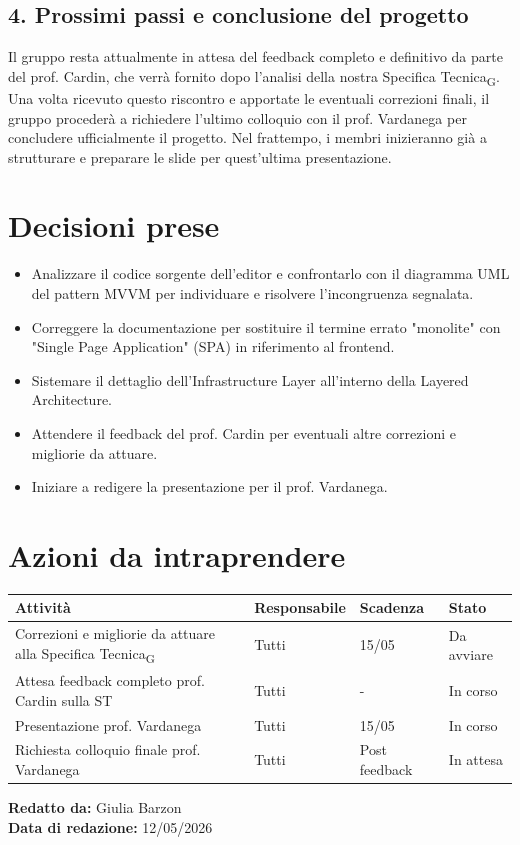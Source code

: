 \documentclass[a4paper,12pt]{article}
\newcommand{\gls}[1]{#1\textsubscript{G}}
\begin{document}
\subsection*{4. Prossimi passi e conclusione del progetto}
Il gruppo resta attualmente in attesa del feedback completo e definitivo da parte del prof. Cardin, che verrà fornito dopo l'analisi della nostra \gls{Specifica Tecnica}. Una volta ricevuto questo riscontro e apportate le eventuali correzioni finali, il gruppo procederà a richiedere l'ultimo colloquio con il prof. Vardanega per concludere ufficialmente il progetto. Nel frattempo, i membri inizieranno già a strutturare e preparare le slide per quest'ultima presentazione.

\newpage

\section*{Decisioni prese}
\begin{itemize}
    \item Analizzare il codice sorgente dell'editor e confrontarlo con il diagramma UML del pattern MVVM per individuare e risolvere l'incongruenza segnalata.
    \item Correggere la documentazione per sostituire il termine errato "monolite" con "Single Page Application" (SPA) in riferimento al frontend.
    \item Sistemare il dettaglio dell'Infrastructure Layer all'interno della Layered Architecture.
    \item Attendere il feedback del prof. Cardin per eventuali altre correzioni e migliorie da attuare.
    \item Iniziare a redigere la presentazione per il prof. Vardanega.
\end{itemize}


\section*{Azioni da intraprendere}
\begin{longtable}{|p{}|p{}|p{}|p{}|}
\hline
\textbf{Attività} & \textbf{Responsabile} & \textbf{Scadenza} & \textbf{Stato} \\ \hline
Correzioni e migliorie da attuare alla \gls{Specifica Tecnica} & Tutti & 15/05 & Da avviare \\ \hline
Attesa feedback completo prof. Cardin sulla ST & Tutti & - & In corso \\ \hline
Presentazione prof. Vardanega & Tutti & 15/05 & In corso \\ \hline
Richiesta colloquio finale prof. Vardanega & Tutti & Post feedback & In attesa \\ \hline
\end{longtable}

\vspace{1cm}

\textbf{Redatto da:} Giulia Barzon \\
\textbf{Data di redazione:} 12/05/2026
\end{document}
